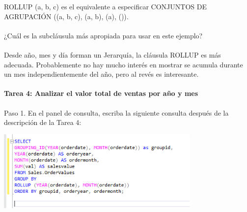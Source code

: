 \begin{flushleft}
ROLLUP (a, b, c) es el equivalente a especificar CONJUNTOS DE AGRUPACIÓN ((a, b, c), (a, b), (a), ()).
\textbf{}\\
\textbf{}\\
¿Cuál es la subcláusula más apropiada para usar en este ejemplo?
\textbf{}\\
\textbf{}\\
 Desde año, mes y día forman un Jerarquía, la cláusula ROLLUP es más adecuada. Probablemente no hay mucho interés en mostrar se acumula durante un mes independientemente del año, pero al revés es interesante.
\textbf{}\\
\textbf{}\\
\textbf{Tarea 4: Analizar el valor total de ventas por año y mes}
\textbf{}\\
\textbf{}\\
Paso 1. En el panel de consulta, escriba la siguiente consulta después de la descripción de la Tarea 4:
\begin{center}
	\includegraphics[width=10cm]{./Imagenes/6img7} 
	\end{center}
\textbf{}\\
\textbf{}\\
\textbf{}\\
\textbf{}\\
\textbf{}\\
\textbf{}\\


\end{flushleft}
